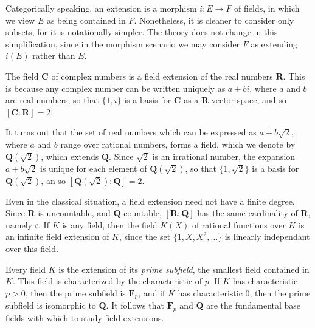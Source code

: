 \begin{remark}
	Categorically speaking, an extension is a morphism $i: E \to F$ of fields, in which we view $E$ as being contained in $F$. Nonetheless, it is cleaner to consider only subsets, for it is notationally simpler. The theory does not change in this simplification, since in the morphism scenario we may consider $F$ as extending $i(E)$ rather than $E$.
\end{remark}

\begin{example}
    The field $\mathbf{C}$ of complex numbers is a field extension of the real numbers $\mathbf{R}$. This is because any complex number can be written uniquely as $a + bi$, where $a$ and $b$ are real numbers, so that $\{ 1, i \}$ is a basis for $\mathbf{C}$ as a $\mathbf{R}$ vector space, and so $[\mathbf{C}: \mathbf{R}] = 2$.
\end{example}

\begin{example}
	It turns out that the set of real numbers which can be expressed as $a + b \sqrt{2}$, where $a$ and $b$ range over rational numbers, forms a field, which we denote by $\mathbf{Q}(\sqrt{2})$, which extends $\mathbf{Q}$. Since $\sqrt{2}$ is an irrational number, the expansion $a + b \sqrt{2}$ is unique for each element of $\mathbf{Q}(\sqrt{2})$, so that $\{ 1, \sqrt{2} \}$ is a basis for $\mathbf{Q}(\sqrt{2})$, an so $[\mathbf{Q}(\sqrt{2}): \mathbf{Q}] = 2$.
\end{example}

\begin{example}
	Even in the classical situation, a field extension need not have a finite degree. Since $\mathbf{R}$ is uncountable, and $\mathbf{Q}$ countable, $[\mathbf{R}: \mathbf{Q}]$ has the same cardinality of $\mathbf{R}$, namely $\mathfrak{c}$. If $K$ is any field, then the field $K(X)$ of rational functions over $K$ is an infinite field extension of $K$, since the set $\{ 1, X, X^2, \dots \}$ is linearly independant over this field.
\end{example}

\begin{example}
    Every field $K$ is the extension of its {\it prime subfield}, the smallest field contained in $K$. This field is characterized by the characteristic of $p$. If $K$ has characteristic $p > 0$, then the prime subfield is $\mathbf{F}_p$, and if $K$ has characteristic 0, then the prime subfield is isomorphic to $\mathbf{Q}$. It follows that $\mathbf{F}_p$ and $\mathbf{Q}$ are the fundamental base fields with which to study field extensions.
\end{example}


